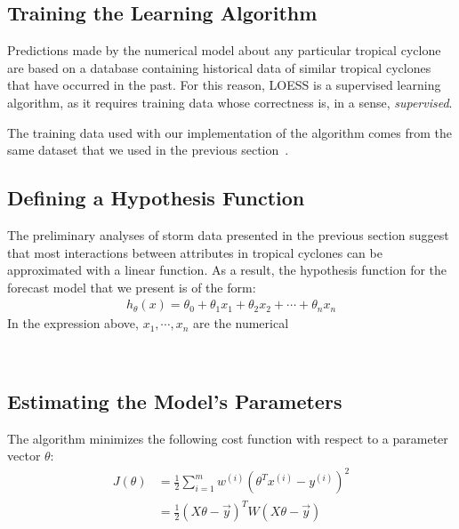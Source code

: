 \documentclass[letterpaper,twocolumn,10pt]{article}
\begin{document}
\subsection{Training the Learning Algorithm}
Predictions made by the numerical model about any particular tropical cyclone
are based on a database containing historical data of similar tropical cyclones
that have occurred in the past. For this reason, LOESS is a supervised learning
algorithm, as it requires training data whose correctness is, in a sense,
\emph{supervised}.

The training data used with our implementation of the algorithm comes from 
the same dataset that we used in the previous section~\cite{BestTrackDataset}.

\subsection{Defining a Hypothesis Function}
The preliminary analyses of storm data presented in the previous section
suggest that most interactions between attributes in tropical cyclones can be
approximated with a linear function. As a result, the hypothesis function for
the forecast model that we present is of the form:
\begin{align*}
  h_{\theta}(x) = \theta_0 + \theta_1 x_1 + \theta_2 x_2 + \cdots + \theta_n x_n
\end{align*}
In the expression above, $x_1, \cdots, x_n$ are the numerical 

~\cite{LinearRegression}

\subsection{Estimating the Model's Parameters}
The algorithm minimizes the following cost function with respect to a parameter
vector $\theta$:
\begin{align}
  J(\theta) &= \frac{1}{2}\sum_{i=1}^{m}{
                w^{(i)}\left(\theta^T x^{(i)} - y^{(i)}\right)^2
              }\\
            &= \frac{1}{2}(X\theta - \vec{y})^T W(X\theta - \vec{y})
\end{align}






\end{document}
